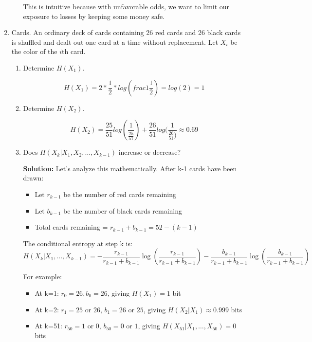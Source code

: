 \documentclass{article}
\begin{document}
\begin{enumerate}
\begin{enumerate}
        This is intuitive because with unfavorable odds, we want to limit our exposure to losses by keeping some money safe.

    \end{enumerate}

    \item Cards. An ordinary deck of cards containing 26 red cards and 26 black cards is shuffled and dealt out one card at a time without replacement. Let $X_i$ be the color of the $i$th card.
    \begin{enumerate}
        \item Determine $H(X_1)$.
        
        \[
        H(X_1) = 2*\frac{1}{2}*log(frac{1}{\frac{1}{2}}) = log(2) = 1
        \]

        \item Determine $H(X_2)$.
        
        \[
        H(X_2) = \frac{25}{51}log(\frac{1}{\frac{25}{51}})+ \frac{26}{51}log(\frac{1}{\frac{26}{51})} \approx 0.69
        \]

        \item Does $H(X_k|X_1, X_2, \ldots, X_{k-1})$ increase or decrease?
        
        \textbf{Solution:} Let's analyze this mathematically. After k-1 cards have been drawn:
        \begin{itemize}
            \item Let $r_{k-1}$ be the number of red cards remaining
            \item Let $b_{k-1}$ be the number of black cards remaining
            \item Total cards remaining = $r_{k-1} + b_{k-1} = 52-(k-1)$
        \end{itemize}
        
        The conditional entropy at step k is:
        \[
            H(X_k|X_1,\ldots,X_{k-1}) = -\frac{r_{k-1}}{r_{k-1}+b_{k-1}}\log(\frac{r_{k-1}}{r_{k-1}+b_{k-1}}) - \frac{b_{k-1}}{r_{k-1}+b_{k-1}}\log(\frac{b_{k-1}}{r_{k-1}+b_{k-1}})
        \]
        
        For example:
        \begin{itemize}
            \item At k=1: $r_0=26, b_0=26$, giving $H(X_1) = 1$ bit
            \item At k=2: $r_1=25$ or $26$, $b_1=26$ or $25$, giving $H(X_2|X_1) \approx 0.999$ bits
            \item At k=51: $r_{50}=1$ or $0$, $b_{50}=0$ or $1$, giving $H(X_{51}|X_1,\ldots,X_{50}) = 0$ bits
        \end{itemize}
        

\end{enumerate}
\end{enumerate}
\end{document}
